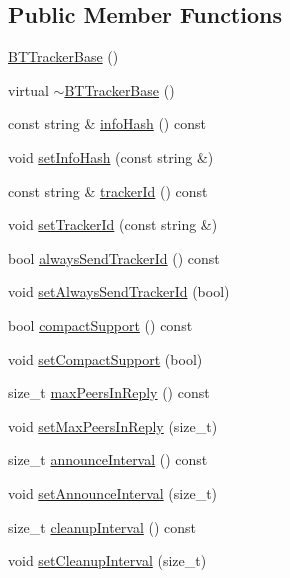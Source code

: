 \subsection*{Public Member Functions}
\begin{DoxyCompactItemize}
\item 
\hyperlink{classBTTrackerBase_a05a7a0e4b4514e39d25dcf7d34bc254f}{B\+T\+Tracker\+Base} ()
\item 
virtual \hyperlink{classBTTrackerBase_a8b324ddad0dae22cccb338ce183e12b4}{$\sim$\+B\+T\+Tracker\+Base} ()
\item 
const string \& \hyperlink{classBTTrackerBase_ad3744373908aaae2c9f88a989f711164}{info\+Hash} () const 
\item 
void \hyperlink{classBTTrackerBase_aa205b2d356794b9414429b6a9bced23b}{set\+Info\+Hash} (const string \&)
\item 
const string \& \hyperlink{classBTTrackerBase_a3892d03da0e26565e6e7e2f813026d7e}{tracker\+Id} () const 
\item 
void \hyperlink{classBTTrackerBase_ab8a18224107ed0910dc0bd1638e6c79e}{set\+Tracker\+Id} (const string \&)
\item 
bool \hyperlink{classBTTrackerBase_a30633c30f74aa526f500587df8f449be}{always\+Send\+Tracker\+Id} () const 
\item 
void \hyperlink{classBTTrackerBase_ad0894e8d363b622b5bb499d13fb62669}{set\+Always\+Send\+Tracker\+Id} (bool)
\item 
bool \hyperlink{classBTTrackerBase_a65a57779fc1a54b53d8730e645246588}{compact\+Support} () const 
\item 
void \hyperlink{classBTTrackerBase_adfebd2b9c4efb1c140bf89a926aa67f8}{set\+Compact\+Support} (bool)
\item 
size\+\_\+t \hyperlink{classBTTrackerBase_a0c341d939c255dea96f2fd9e84fe4dc9}{max\+Peers\+In\+Reply} () const 
\item 
void \hyperlink{classBTTrackerBase_aefc9c49a92f7283de65369d4cfe1236d}{set\+Max\+Peers\+In\+Reply} (size\+\_\+t)
\item 
size\+\_\+t \hyperlink{classBTTrackerBase_a6485fae29881927c04d7271ac28f01eb}{announce\+Interval} () const 
\item 
void \hyperlink{classBTTrackerBase_a05438a148023a31cd72d352e381af208}{set\+Announce\+Interval} (size\+\_\+t)
\item 
size\+\_\+t \hyperlink{classBTTrackerBase_a46737e1276c56c9dc83264cc8cde501a}{cleanup\+Interval} () const 
\item 
void \hyperlink{classBTTrackerBase_ae455bf93bf9c4aac9346e28132358767}{set\+Cleanup\+Interval} (size\+\_\+t)

\end{DoxyCompactItemize}
